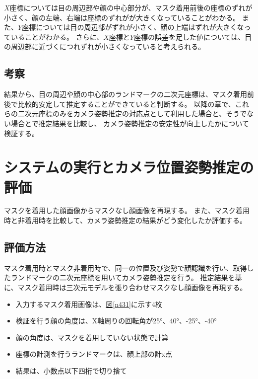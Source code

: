 \documentclass[]{jarticle}          %
\begin{document}
$X$座標については目の周辺部や顔の中心部分が、マスク着用前後の座標のずれが小さく、顔の左端、右端は座標のずれがが大きくなっていることがわかる。
また、$Y$座標については目の周辺部がずれが小さく、顔の上端はずれが大きくなっていることがわかる。
さらに、$X$座標と$Y$座標の誤差を足した値については、目の周辺部に近づくにつれずれが小さくなっていると考えられる。

\subsection{考察}
結果から、目の周辺や顔の中心部のランドマークの二次元座標は、マスク着用前後で比較的安定して推定することができていると判断する。
以降の章で、これらの二次元座標のみをカメラ姿勢推定の対応点として利用した場合と、そうでない場合とで推定結果を比較し、
カメラ姿勢推定の安定性が向上したかについて検証する。


\section{システムの実行とカメラ位置姿勢推定の評価}
マスクを着用した顔画像からマスクなし顔画像を再現する。
また、マスク着用時と非着用時を比較して、カメラ姿勢推定の結果がどう変化したか評価する。
\subsection{評価方法}
マスク着用時とマスク非着用時で、同一の位置及び姿勢で顔認識を行い、取得したランドマークの二次元座標を用いてカメラ姿勢推定を行う。
推定結果を基に、マスク着用時は三次元モデルを張り合わせマスクなし顔画像を再現する。
\begin{itemize}
  \item 入力するマスク着用画像は、\hyperref[n431]{図\ref{n431}}に示す4枚
  \item 検証を行う顔の角度は、X軸周りの回転角が25°、40°、-25°、-40°
  \item 顔の角度は、マスクを着用していない状態で計算
  \item 座標の計測を行うランドマークは、顔上部の計x点
  \item 結果は、小数点以下四桁で切り捨て
\end{itemize}
\end{document}
